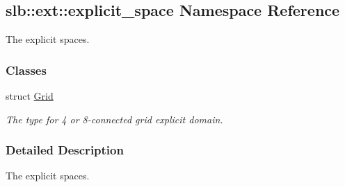 \hypertarget{namespaceslb_1_1ext_1_1explicit__space}{}\subsection{slb\+:\+:ext\+:\+:explicit\+\_\+space Namespace Reference}
\label{namespaceslb_1_1ext_1_1explicit__space}


The explicit spaces.  


\subsubsection*{Classes}
\begin{DoxyCompactItemize}
\item 
struct \hyperlink{structslb_1_1ext_1_1explicit__space_1_1Grid}{Grid}
\begin{DoxyCompactList}\small\item\em The type for 4 or 8-\/connected grid explicit domain. \end{DoxyCompactList}\end{DoxyCompactItemize}


\subsubsection{Detailed Description}
The explicit spaces. 
